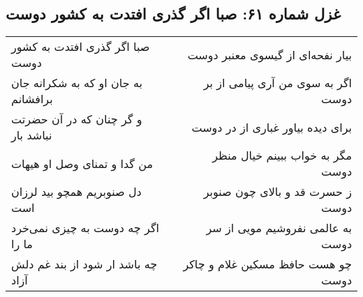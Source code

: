 \begin{center}
\section*{غزل شماره ۶۱: صبا اگر گذری افتدت به کشور دوست}
\label{sec:sh061}
\begin{longtable}{l p{0.5cm} r}
صبا اگر گذری افتدت به کشور دوست
&&
بیار نفحه‌ای از گیسوی معنبر دوست
\\
به جان او که به شکرانه جان برافشانم
&&
اگر به سوی من آری پیامی از بر دوست
\\
و گر چنان که در آن حضرتت نباشد بار
&&
برای دیده بیاور غباری از در دوست
\\
من گدا و تمنای وصل او هیهات
&&
مگر به خواب ببینم خیال منظر دوست
\\
دل صنوبریم همچو بید لرزان است
&&
ز حسرت قد و بالای چون صنوبر دوست
\\
اگر چه دوست به چیزی نمی‌خرد ما را
&&
به عالمی نفروشیم مویی از سر دوست
\\
چه باشد ار شود از بند غم دلش آزاد
&&
چو هست حافظ مسکین غلام و چاکر دوست
\\
\end{longtable}
\end{center}
